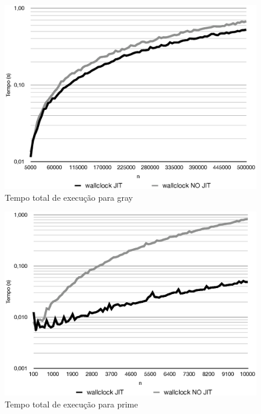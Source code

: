 \begin{figure}[ht!]
  \centering
  \includegraphics[scale=0.70]{figs/gray_tempo}
  \caption{Tempo total de execução para gray \label{fig:gray-tempo}}
\end{figure}
\begin{figure}[ht!]
  \centering
  \includegraphics[scale=0.70]{figs/prime_tempo}
  \caption{Tempo total de execução para prime \label{fig:prime-tempo}}
\end{figure}
